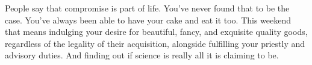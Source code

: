 \documentclass[char]{GL2020}
\begin{document}
People say that compromise is part of life. You’ve never found that to be the case. You’ve always been able to have your cake and eat it too. This weekend that means indulging your desire for beautiful, fancy, and exquisite quality goods, regardless of the legality of their acquisition, alongside fulfilling your priestly and advisory duties. And finding out if \pTech{} science is really all it is claiming to be.
%
%
%
%
%
%
%
%
\end{document}
